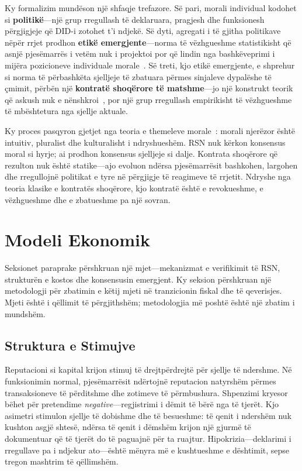\documentclass[11pt,a4paper,twocolumn]{article}
\begin{document}
Ky formalizim mundëson një shfaqje trefazore. Së pari, morali individual kodohet si \textbf{politikë}---një grup rregullash të deklaruara, pragjesh dhe funksionesh përgjigjeje që DID-i zotohet t'i ndjekë. Së dyti, agregati i të gjitha politikave nëpër rrjet prodhon \textbf{etikë emergjente}---norma të vëzhgueshme statistikisht që asnjë pjesëmarrës i vetëm nuk i projektoi por që lindin nga bashkëveprimi i mijëra pozicioneve individuale morale~\cite{durkheim1893}. Së treti, kjo etikë emergjente, e shprehur si norma të përbashkëta sjelljeje të zbatuara përmes sinjaleve dypalëshe të çmimit, përbën një \textbf{kontratë shoqërore të matshme}---jo një konstrukt teorik që askush nuk e nënshkroi~\cite{rawls1971}, por një grup rregullash empirikisht të vëzhgueshme të mbështetura nga sjellje aktuale.

Ky proces pasqyron gjetjet nga teoria e themeleve morale~\cite{haidt2012}: morali njerëzor është intuitiv, pluralist dhe kulturalisht i ndryshueshëm. RSN nuk kërkon konsensus moral si hyrje; ai prodhon konsensus sjelljeje si dalje. Kontrata shoqërore që rezulton nuk është statike---ajo evoluon ndërsa pjesëmarrësit bashkohen, largohen dhe rregullojnë politikat e tyre në përgjigje të reagimeve të rrjetit. Ndryshe nga teoria klasike e kontratës shoqërore, kjo kontratë është e revokueshme, e vëzhgueshme dhe e zbatueshme pa një sovran.

\section{Modeli Ekonomik}

Seksionet paraprake përshkruan një mjet---mekanizmat e verifikimit të RSN, strukturën e kostos dhe konsensusin emergjent. Ky seksion përshkruan një metodologji për zbatimin e këtij mjeti në tranzicionin fiskal dhe të qeverisjes. Mjeti është i qëllimit të përgjithshëm; metodologjia më poshtë është një zbatim i mundshëm.

\subsection{Struktura e Stimujve}

Reputacioni si kapital krijon stimuj të drejtpërdrejtë për sjellje të ndershme. Në funksionimin normal, pjesëmarrësit ndërtojnë reputacion natyrshëm përmes transaksioneve të përditshme dhe zotimeve të përmbushura. Shpenzimi kryesor bëhet për pretendime \emph{negative}---regjistrimi i dëmit të bërë nga të tjerët. Kjo asimetri stimulon sjellje të dobishme dhe të besueshme: të qenit i ndershëm nuk kushton asgjë shtesë, ndërsa të qenit i dëmshëm krijon një gjurmë të dokumentuar që të tjerët do të paguajnë për ta ruajtur. Hipokrizia---deklarimi i rregullave pa i ndjekur ato---është mënyra më e kushtueshme e dështimit, sepse tregon mashtrim të qëllimshëm.
\end{document}
